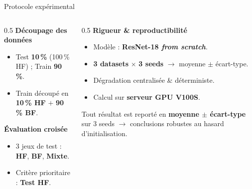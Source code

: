 \documentclass[aspectratio=169, 11pt]{beamer}
\begin{document}
\begin{frame}{Protocole expérimental}
  \begin{columns}[T]
    \begin{column}{0.5\textwidth}
      \textbf{Découpage des données}
      \begin{itemize}
        \item Test \textbf{10\,\%} (100\,\% HF) ; Train \textbf{90\,\%}.
        \item Train découpé en \textbf{10\,\% HF} $+$ \textbf{90\,\% BF}.
      \end{itemize}
      \vspace{0.2em}
      \textbf{Évaluation croisée}
      \begin{itemize}
        \item 3 jeux de test : \textbf{HF}, \textbf{BF}, \textbf{Mixte}.
        \item Critère prioritaire : \textbf{Test HF}.
      \end{itemize}
    \end{column}
    \begin{column}{0.5\textwidth}
      \textbf{Rigueur \& reproductibilité}
      \begin{itemize}
        \item Modèle : \textbf{ResNet-18 \emph{from scratch}}.
        \item \textbf{3 datasets} $\times$ \textbf{3 seeds} $\rightarrow$ moyenne $\pm$ écart-type.
        \item Dégradation centralisée \& déterministe.
        \item Calcul sur \textbf{serveur GPU V100S}.
      \end{itemize}
      \vspace{0.4em}
      \begin{key}
        \footnotesize Tout résultat est reporté en \textbf{moyenne $\pm$ écart-type}
        sur 3 seeds $\rightarrow$ conclusions robustes au hasard d'initialisation.
      \end{key}
    \end{column}
  \end{columns}
\end{frame}
\end{document}
